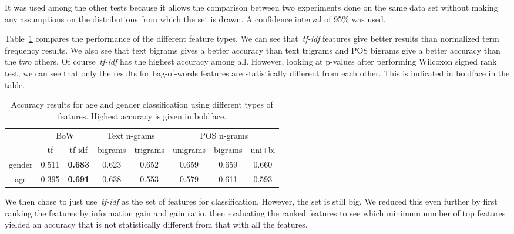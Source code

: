 \documentclass[a4paper]{llncs}
\begin{document}
It was used among the other tests because it allows the comparison between two experiments done on the same data set without making any assumptions on the distributions from which the set is drawn. A confidence interval of 95\% was used.

Table~\ref{table:DiffFeaturesResults} compares the performance of the different feature types. We can see that~\textit{tf-idf} features give better results than normalized term frequency results. We also see that text bigrams gives a better accuracy than text trigrams and POS bigrams give a better accuracy than the two others. Of course~\textit{tf-idf} has the highest accuracy among all. However, looking at p-values after performing Wilcoxon signed rank test, we can see that only the results for bag-of-words features are statistically different from each other. This is indicated in boldface in the table. 


\begin{table}[]
\centering
\begin{tabular}{|l|cc|cc|ccc|}
\hline
\multirow{2}{*}{}            & \multicolumn{2}{c|}{BoW} & \multicolumn{2}{c|}{Text n-grams} & \multicolumn{3}{c|}{POS n-grams} \\ %
                             & tf     & tf-idf           & bigrams        & trigrams        & unigrams   & bigrams  & uni+bi  \\ \hline
\multicolumn{1}{|c|}{gender} & 0.511  & \textbf{0.683}  & 0.623          & 0.652           & 0.659      & 0.659    & 0.660   \\ %
\multicolumn{1}{|c|}{age}    & 0.395  & \textbf{0.691}  & 0.638          & 0.553           & 0.579      & 0.611    & 0.593   \\ \hline
\end{tabular}
\caption{Accuracy results for age and gender classification using different types of features. Highest accuracy is given in boldface.}
\label{table:DiffFeaturesResults}
\end{table}

We then chose to just use~\textit{tf-idf} as the set of features for classification. However, the set is still big. We reduced this even further by first ranking the features by information gain and gain ratio, then evaluating the ranked features to see which minimum number of top features yielded an accuracy that is not statistically different from that with all the features. 
\end{document}
